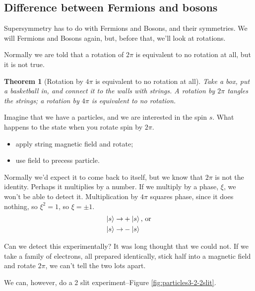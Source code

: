 \documentclass[]{article}
\newtheorem{thm}{Theorem}
\begin{document}
\subsection{Difference between Fermions and bosons}
Supersymmetry has to do with Fermions and Bosons, and their symmetries. We will Fermions and Bosons again, but, before that, we'll look at rotations.

Normally we are told that a rotation of $2\pi$ is equivalent to no rotation at all, but it is not true.

\begin{thm}[Rotation by $4\pi$ is equivalent to no rotation at all]
	Take a box, put a basketball in, and connect it to the walls with strings. A rotation by $2\pi$ tangles the strings; a rotation by $4\pi$ is equivalent to no rotation.
\end{thm}

Imagine that we have a particles, and we are interested in the spin $s$. What happens to the state when you rotate spin by $2\pi$.
\begin{itemize}
	\item apply string magnetic field and rotate;
	\item use field to precess particle.
\end{itemize}

Normally we'd expect it to come back to itself, but we know that $2\pi$ is not the identity. Perhaps it multiplies by a number. If we multiply by a phase, $\xi$, we won't be able to detect it. Multiplication by $4\pi$ squares phase, since it does nothing, so $\xi^2=1$, so $\xi=\pm1$.
\begin{align*}
	\ket{s} \rightarrow& +\ket{s} \text{, or}\\
	\ket{s} \rightarrow& -\ket{s}
\end{align*}

Can we detect this experimentally? It was long thought that we could not. If we take a family of electrons, all prepared identically, stick half into a magnetic field and rotate $2\pi$, we can't tell the two lots apart.

We can, however, do a 2 slit experiment\cite{aharonov1967observability}--Figure \ref{fig:particles3-2-2slit}.
\end{document}
